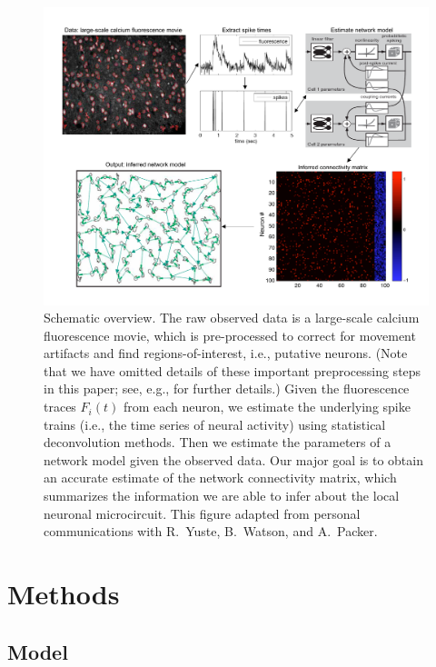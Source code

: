 \documentclass[aoas,preprint]{imsart}
\begin{document}
\begin{figure}[t!]
	\centering
	\includegraphics[width=\hsize]{../figs/yuri-paper-schematic}
	\caption{Schematic overview. The raw observed data is a
	large-scale calcium fluorescence movie, which is pre-processed
	to correct for movement artifacts and find
	regions-of-interest, i.e., putative neurons.  (Note that we
	have omitted details of these important preprocessing steps in
	this paper; see, e.g., \cite{CAR03,DombeckTank07} for further
	details.)  Given the fluorescence traces $F_i(t)$ from each
	neuron, we estimate the underlying spike trains (i.e., the
	time series of neural activity) using statistical
	deconvolution methods.  Then we estimate the parameters of a
	network model given the observed data.  Our major goal is to
	obtain an accurate estimate of the network connectivity
	matrix, which summarizes the information we are able to infer
	about the local neuronal microcircuit. This figure adapted
	from personal communications with R.\ Yuste, B.\ Watson, and
	A.\ Packer.}
	\label{fig:data_schematic}
\end{figure}


\section{Methods}
\label{sec:methods}
\subsection{Model}
\label{sec:methods:markov-setup}
\end{document}
